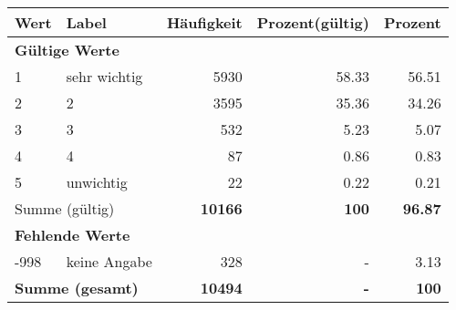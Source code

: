      \begin{longtable}{lXrrr}
     \toprule
     \textbf{Wert} & \textbf{Label} & \textbf{Häufigkeit} & \textbf{Prozent(gültig)} & \textbf{Prozent} \\
     \endhead
     \midrule
     \multicolumn{5}{l}{\textbf{Gültige Werte}}\\

     1 &
     \multicolumn{1}{X}{ sehr wichtig   } &


       \num{5930} &
       \num[round-mode=places,round-precision=2]{58,33} &
         \num[round-mode=places,round-precision=2]{56,51} \\

     2 &
     \multicolumn{1}{X}{ 2   } &


       \num{3595} &
       \num[round-mode=places,round-precision=2]{35,36} &
         \num[round-mode=places,round-precision=2]{34,26} \\

     3 &
     \multicolumn{1}{X}{ 3   } &


       \num{532} &
       \num[round-mode=places,round-precision=2]{5,23} &
         \num[round-mode=places,round-precision=2]{5,07} \\

     4 &
     \multicolumn{1}{X}{ 4   } &


       \num{87} &
       \num[round-mode=places,round-precision=2]{0,86} &
         \num[round-mode=places,round-precision=2]{0,83} \\

     5 &
     \multicolumn{1}{X}{ unwichtig   } &


       \num{22} &
       \num[round-mode=places,round-precision=2]{0,22} &
         \num[round-mode=places,round-precision=2]{0,21} \\
     \midrule
     \multicolumn{2}{l}{Summe (gültig)} &
       \textbf{\num{10166}} &
     \textbf{100} &
       \textbf{\num[round-mode=places,round-precision=2]{96,87}} \\
     \multicolumn{5}{l}{\textbf{Fehlende Werte}}\\
       -998 &
       keine Angabe &
         \num{328} &
        - &
         \num[round-mode=places,round-precision=2]{3,13} \\
     \midrule
     \multicolumn{2}{l}{\textbf{Summe (gesamt)}} &
          \textbf{\num{10494}} &
        \textbf{-} &
        \textbf{100} \\
     \bottomrule
     \end{longtable}
     
